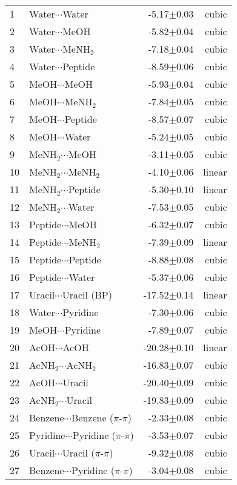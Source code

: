 \begin{longtable}{llrr}
1 & Water$\cdots$Water & -5.17$\pm$0.03 & cubic \\
2 & Water$\cdots$MeOH & -5.82$\pm$0.04 & cubic \\
3 & Water$\cdots$MeNH$_2$ & -7.18$\pm$0.04 & cubic \\
4 & Water$\cdots$Peptide & -8.59$\pm$0.06 & cubic \\
5 & MeOH$\cdots$MeOH & -5.93$\pm$0.04 & cubic \\
6 & MeOH$\cdots$MeNH$_2$ & -7.84$\pm$0.05 & cubic \\
7 & MeOH$\cdots$Peptide & -8.57$\pm$0.07 & cubic \\
8 & MeOH$\cdots$Water & -5.24$\pm$0.05 & cubic \\
9 & MeNH$_2$$\cdots$MeOH & -3.11$\pm$0.05 & cubic \\
10 & MeNH$_2$$\cdots$MeNH$_2$ & -4.10$\pm$0.06 & linear \\
11 & MeNH$_2$$\cdots$Peptide & -5.30$\pm$0.10 & linear \\
12 & MeNH$_2$$\cdots$Water & -7.53$\pm$0.05 & cubic \\
13 & Peptide$\cdots$MeOH & -6.32$\pm$0.07 & cubic \\
14 & Peptide$\cdots$MeNH$_2$ & -7.39$\pm$0.09 & linear \\
15 & Peptide$\cdots$Peptide & -8.88$\pm$0.08 & cubic \\
16 & Peptide$\cdots$Water & -5.37$\pm$0.06 & cubic \\
17 & Uracil$\cdots$Uracil (BP) & -17.52$\pm$0.14 & linear \\
18 & Water$\cdots$Pyridine & -7.30$\pm$0.06 & cubic \\
19 & MeOH$\cdots$Pyridine & -7.89$\pm$0.07 & cubic \\
20 & AcOH$\cdots$AcOH & -20.28$\pm$0.10 & linear \\
21 & AcNH$_2$$\cdots$AcNH$_2$ & -16.83$\pm$0.07 & cubic \\
22 & AcOH$\cdots$Uracil & -20.40$\pm$0.09 & cubic \\
23 & AcNH$_2$$\cdots$Uracil & -19.83$\pm$0.09 & cubic \\
24 & Benzene$\cdots$Benzene ($\pi$-$\pi$) & -2.33$\pm$0.08 & cubic \\
25 & Pyridine$\cdots$Pyridine ($\pi$-$\pi$) & -3.53$\pm$0.07 & cubic \\
26 & Uracil$\cdots$Uracil ($\pi$-$\pi$) & -9.32$\pm$0.08 & cubic \\
27 & Benzene$\cdots$Pyridine ($\pi$-$\pi$) & -3.04$\pm$0.08 & cubic \\

\end{longtable}
